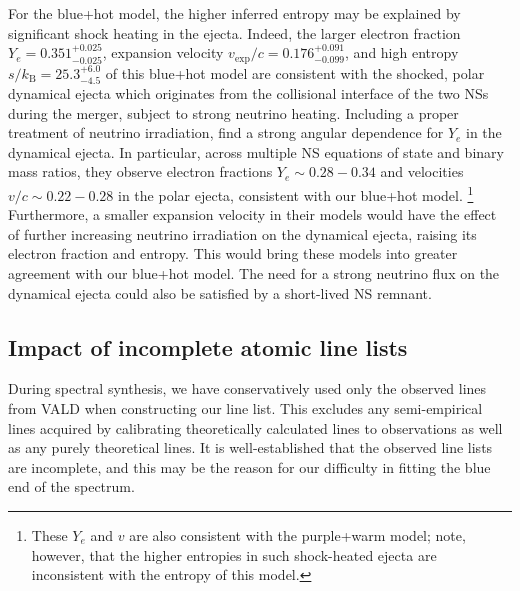 \documentclass[twocolumn, twocolappendix]{aastex63}
\begin{document}
For the blue+hot model, the higher inferred entropy may be explained by significant shock heating in the ejecta. Indeed, the larger electron fraction $Y_e = 0.351^{+0.025}_{-0.025}$, expansion velocity $v_{\mathrm{exp}}/c = 0.176^{+0.091}_{-0.099}$, and high entropy $s/k_{\mathrm{B}} = 25.3^{+6.0}_{-4.5}$ of this blue+hot model are consistent with the shocked, polar dynamical ejecta which originates from the collisional interface of the two NSs during the merger, subject to strong neutrino heating. Including a proper treatment of neutrino irradiation, \cite{kullmann22a, just22} find a strong angular dependence for $Y_e$ in the dynamical ejecta. In particular, across multiple NS equations of state and binary mass ratios, they observe electron fractions $Y_e \sim 0.28 - 0.34$ and velocities $v/c \sim 0.22 - 0.28$ in the polar ejecta, consistent with our blue+hot model. \footnote{These $Y_e$ and $v$ are also consistent with the purple+warm model; note, however, that the higher entropies in such shock-heated ejecta are inconsistent with the entropy of this model.} Furthermore, a smaller expansion velocity in their models would have the effect of further increasing neutrino irradiation on the dynamical ejecta, raising its electron fraction and entropy. This would bring these models into greater agreement with our blue+hot model. The need for a strong neutrino flux on the dynamical ejecta could also be satisfied by a short-lived NS remnant.


\subsection{Impact of incomplete atomic line lists}\label{ssc:incomplete_lines}

During spectral synthesis, we have conservatively used only the observed lines from VALD when constructing our line list. This excludes any semi-empirical lines acquired by calibrating theoretically calculated lines to observations as well as any purely theoretical lines. It is well-established that the observed line lists are incomplete, and this may be the reason for our difficulty in fitting the blue end of the spectrum.   
\end{document}
